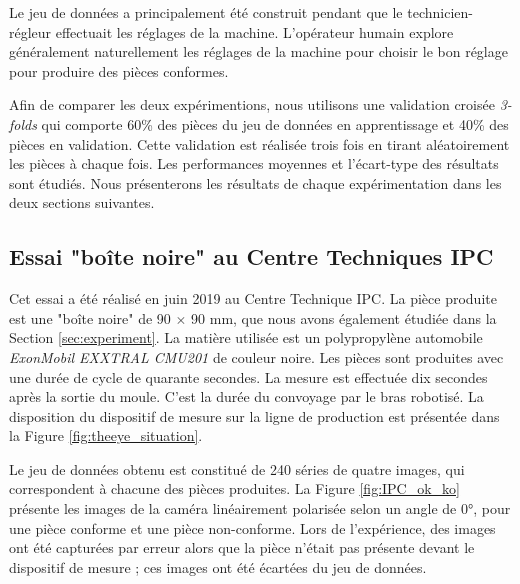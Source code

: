 Le jeu de données a principalement été construit pendant que le technicien-régleur effectuait les réglages de la machine.
L’opérateur humain explore généralement naturellement les réglages de la machine pour choisir le bon réglage pour produire des pièces conformes.

Afin de comparer les deux expérimentions, nous utilisons une validation croisée \textit{3-folds} qui comporte 60\% des pièces du jeu de données en apprentissage et 40\% des pièces en validation.
Cette validation est réalisée trois fois en tirant aléatoirement les pièces à chaque fois.
Les performances moyennes et l'écart-type des résultats sont étudiés.
Nous présenterons les résultats de chaque expérimentation dans les deux sections suivantes.


\subsection{Essai "boîte noire" au Centre Techniques IPC} \label{subsec:box_trial}
Cet essai a été réalisé en juin 2019 au Centre Technique IPC.
La pièce produite est une "boîte noire" de 90 $\times$ 90 mm, que nous avons également étudiée dans la Section \ref{sec:experiment}.
La matière utilisée est un polypropylène automobile \textit{ExonMobil EXXTRAL CMU201} de couleur noire.
Les pièces sont produites avec une durée de cycle de quarante secondes.
La mesure est effectuée dix secondes après la sortie du moule.
C'est la durée du convoyage par le bras robotisé.
La disposition du dispositif de mesure sur la ligne de production est présentée dans la Figure \ref{fig:theeye_situation}.

Le jeu de données obtenu est constitué de 240 séries de quatre images, qui correspondent à chacune des pièces produites.
La Figure \ref{fig:IPC_ok_ko} présente les images de la caméra linéairement polarisée selon un angle de 0°, pour une pièce conforme et une pièce non-conforme.
Lors de l'expérience, des images ont été capturées par erreur alors que la pièce n'était pas présente devant le dispositif de mesure ; ces images ont été écartées du jeu de données.


